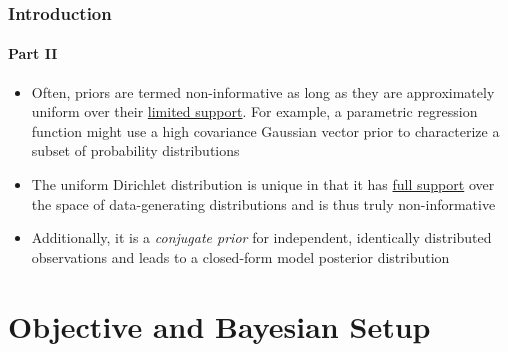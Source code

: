 \documentclass[aspectratio=169]{beamer}
\begin{document}
\begin{frame}
\frametitle{Introduction}
\framesubtitle{Part II}

\begin{itemize}
\item Often, priors are termed non-informative as long as they are approximately uniform over their \underline{limited support}. For example, a parametric regression function might use a high covariance Gaussian vector prior to characterize a subset of probability distributions
\vspace{0.5em}
\item The uniform Dirichlet distribution is unique in that it has \underline{full support} over the space of data-generating distributions and is thus truly non-informative
\vspace{0.5em}
\item Additionally, it is a \emph{conjugate prior} for independent, identically distributed observations and leads to a closed-form model posterior distribution

\end{itemize}

\end{frame}



\section{Objective and Bayesian Setup}
\end{document}
